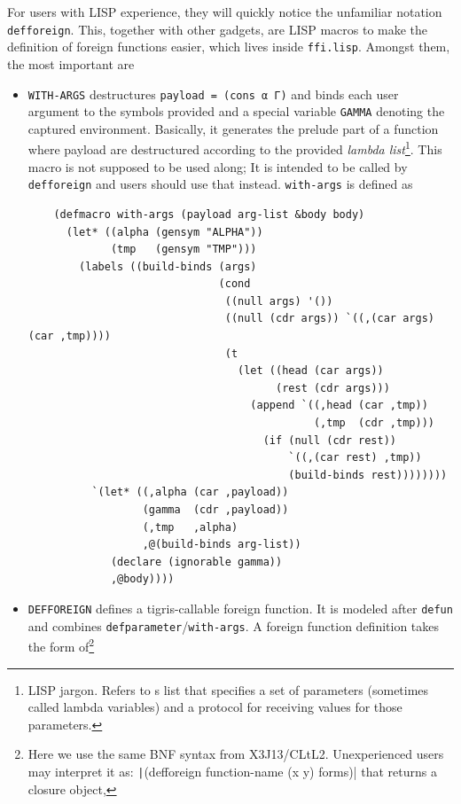 \documentclass[a4paper, 11pt]{article}
\theoremstyle{remark}\newtheorem*{remark}{Remark}
\theoremstyle{definition}\newtheorem*{definition}{Definition}
\begin{document}
For users with LISP experience, they will quickly notice the unfamiliar notation \texttt{defforeign}.
This, together with other gadgets,
are LISP macros to make the definition of foreign
functions easier, which lives inside \texttt{ffi.lisp}. Amongst them, the most important are
\begin{itemize}
\item \texttt{WITH-ARGS} destructures \texttt{payload = (cons α Γ)} and binds each user argument
  to the symbols provided and a special variable \texttt{GAMMA} denoting the captured environment. Basically,
  it generates the prelude part of a function where payload are destructured according to the provided
  \emph{lambda list}\footnote{LISP jargon. Refers to s list that specifies a set of parameters (sometimes called lambda variables) and a protocol for receiving values for those parameters.}.
  This macro is not supposed to be used along; It is intended to be called by
  \texttt{defforeign} and users should use that instead.
  \texttt{with-args} is defined as
  \begin{verbatim}
    (defmacro with-args (payload arg-list &body body)
      (let* ((alpha (gensym "ALPHA"))
             (tmp   (gensym "TMP")))
        (labels ((build-binds (args)
                              (cond
                               ((null args) '())
                               ((null (cdr args)) `((,(car args) (car ,tmp))))
                               (t
                                 (let ((head (car args))
                                       (rest (cdr args)))
                                   (append `((,head (car ,tmp))
                                             (,tmp  (cdr ,tmp)))
                                     (if (null (cdr rest))
                                         `((,(car rest) ,tmp))
                                         (build-binds rest))))))))
          `(let* ((,alpha (car ,payload))
                  (gamma  (cdr ,payload))
                  (,tmp   ,alpha)
                  ,@(build-binds arg-list))
             (declare (ignorable gamma))
             ,@body))))
  \end{verbatim}
\item \texttt{DEFFOREIGN} defines a tigris-callable foreign function. It is modeled
  after \texttt{defun} and combines \texttt{defparameter}/\texttt{with-args}.
  A foreign function definition takes the form of\footnote{
    Here we use the same BNF syntax from X3J13/CLtL2. Unexperienced users may interpret it as:
    \texttt|(defforeign function-name (x y) forms)| that returns a closure object,
}
\end{itemize}
\end{document}
